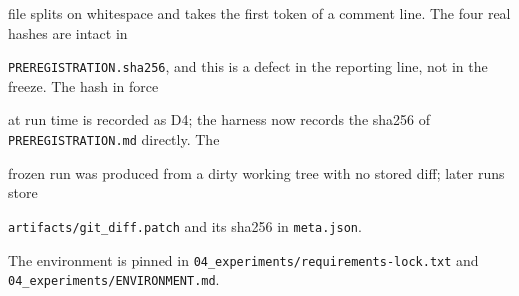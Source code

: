 file splits on whitespace and takes the first token of a comment line. The four real hashes are intact in

\texttt{PREREGISTRATION.sha256}, and this is a defect in the reporting line, not in the freeze. The hash in force

at run time is recorded as D4; the harness now records the sha256 of \texttt{PREREGISTRATION.md} directly. The

frozen run was produced from a dirty working tree with no stored diff; later runs store

\texttt{artifacts/\allowbreak{}git\_diff.patch} and its sha256 in \texttt{meta.json}.

The environment is pinned in \texttt{04\_experiments/\allowbreak{}requirements-lock.txt} and \texttt{04\_experiments/\allowbreak{}ENVIRONMENT.md}.





